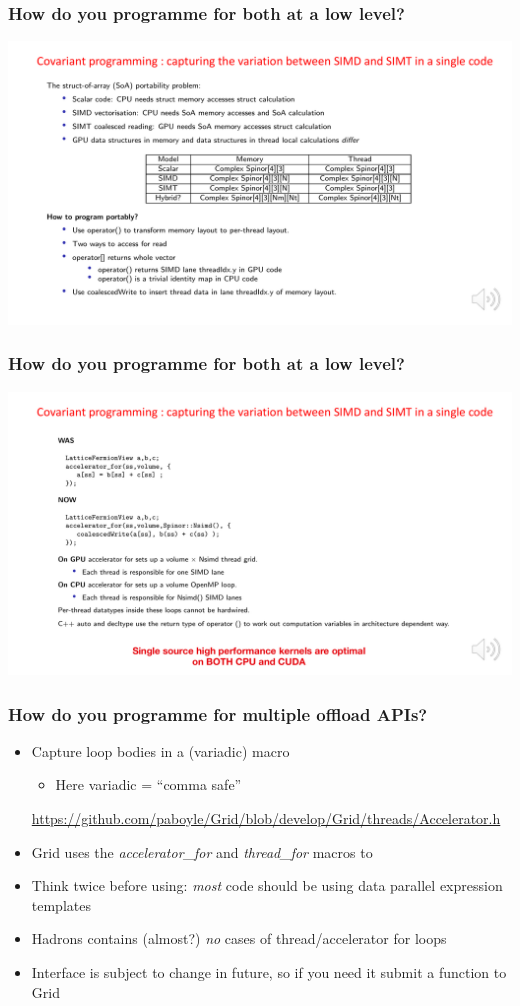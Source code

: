 \documentclass[pdf,ps,8pt]{beamer}
\newcommand{\link}[1]{\href{#1}{ {\color{blue} #1} }}
\begin{document}
\begin{frame}[fragile]\small\frametitle{ How do you programme for both at a low level?}
\includegraphics[width=\textwidth]{SIMD_SIMT.pdf}
\end{frame}
\begin{frame}[fragile]\small\frametitle{ How do you programme for both at a low level?}
\includegraphics[width=\textwidth]{SIMD_SIMT_2.pdf}
\end{frame}

\begin{frame}[fragile]\small\frametitle{ How do you programme for multiple offload APIs?}
  \begin{itemize}
  \item Capture loop bodies in a (variadic) macro
  \begin{itemize}
    \item Here variadic = ``comma safe''
  \end{itemize}
  \link{https://github.com/paboyle/Grid/blob/develop/Grid/threads/Accelerator.h}
  \item Grid uses the \emph{accelerator\_for} and \emph{thread\_for} macros to 
  \item Think twice before using: \emph{most} code should be using data parallel expression templates
  \item Hadrons contains (almost?) \emph{no} cases of thread/accelerator for loops
  \item Interface is subject to change in future, so if you need it submit a function to Grid
  \end{itemize}
\end{frame}
\end{document}
